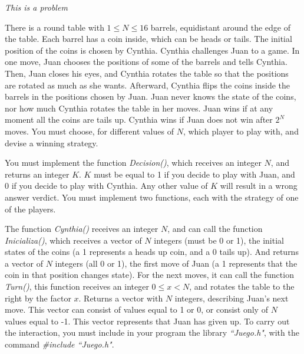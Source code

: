 \documentclass[12pt]{scrartcl}
\begin{document}
    
    {\itshape This is a problem}
    
    \vspace{10pt}

    
    There is a round table with $1 \le N \le 16$ barrels, equidistant around the edge of the table. Each barrel has a coin inside, which can be heads or tails. The initial position of the coins is chosen by Cynthia. Cynthia challenges Juan to a game. In one move, Juan chooses the positions of some of the barrels and tells Cynthia. Then, Juan closes his eyes, and Cynthia rotates the table so that the positions are rotated as much as she wants. Afterward, Cynthia flips the coins inside the barrels in the positions chosen by Juan. Juan never knows the state of the coins, nor how much Cynthia rotates the table in her moves. Juan wins if at any moment all the coins are tails up. Cynthia wins if Juan does not win after $2^N$ moves. You must choose, for different values of $N$, which player to play with, and devise a winning strategy.


    You must implement the function \textit{Decision()}, which receives an integer $N$, and returns an integer $K$. $K$ must be equal to 1 if you decide to play with Juan, and 0 if you decide to play with Cynthia. Any other value of $K$ will result in a wrong answer verdict. You must implement two functions, each with the strategy of one of the players.
    
    The function \textit{Cynthia()} receives an integer $N$, and can call the function \textit{Inicializa()}, which receives a vector of $N$ integers (must be 0 or 1), the initial states of the coins (a 1 represents a heads up coin, and a 0 tails up). And returns a vector of $N$ integers (all 0 or 1), the first move of Juan (a 1 represents that the coin in that position changes state). For the next moves, it can call the function \textit{Turn()}, this function receives an integer $0 \le x < N$, and rotates the table to the right by the factor $x$. Returns a vector with $N$ integers, describing Juan's next move. This vector can consist of values equal to 1 or 0, or consist only of $N$ values equal to -1. This vector represents that Juan has given up. To carry out the interaction, you must include in your program the library \textit{``Juego.h"}, with the command \textit{\#include ``Juego.h"}.
\end{document}
